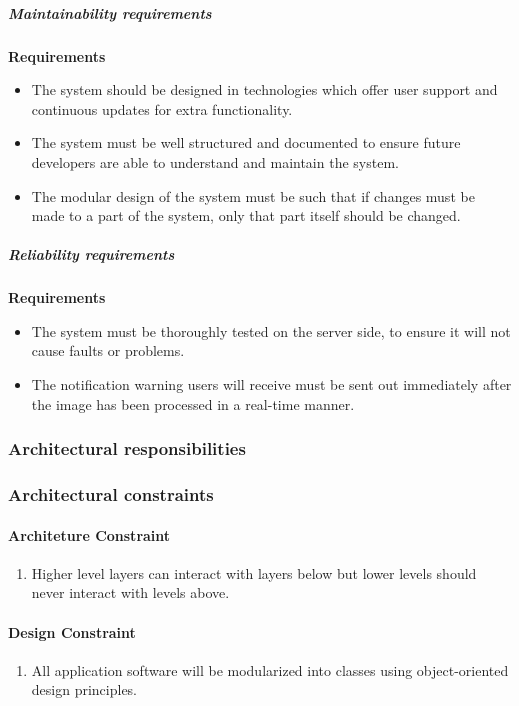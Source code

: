 \documentclass[a4paper,12pt]{report}
\begin{document}
		\subparagraph{Maintainability requirements}
			\hfill \break
			\hfill \break
			\textbf{Requirements}
				\begin{itemize}
					\item The system should be designed in technologies which offer user support and continuous updates for extra functionality.
					\item The system must be well structured and documented to ensure future developers are able to understand and maintain the system.
					\item The modular design of the system must be such that if changes must be made to a part of the system, only that part itself should be changed.
				\end{itemize}
		
		\subparagraph{Reliability requirements}
			\hfill \break
			\hfill \break
			\textbf{Requirements}
				\begin{itemize}
					\item The system must be thoroughly tested on the server side, to ensure it will not cause faults or problems.
					\item The notification warning users will receive must be sent out immediately after the image has been processed in a real-time manner.
				\end{itemize}
		
			
\subsubsection{Architectural responsibilities}


\subsubsection{Architectural constraints}
\paragraph{Architeture Constraint}
\begin{enumerate}
	\item Higher level layers can interact with layers below but lower levels should never interact with levels above.
\end{enumerate}
\paragraph{Design Constraint}
\begin{enumerate}
	\item All application software will be modularized into classes using object-oriented design principles.
\end{enumerate}
\end{document}

